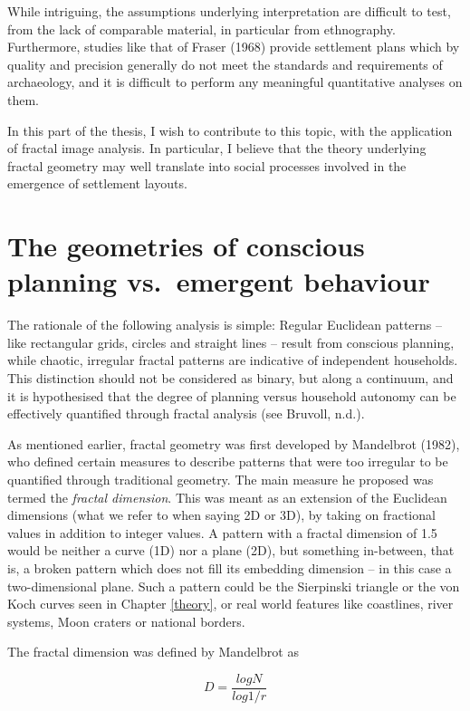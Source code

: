 \documentclass[
  12pt,
  a4paper, twoside]{book}
\begin{document}
While intriguing, the assumptions underlying interpretation are difficult to test, from the lack of comparable material, in particular from ethnography. Furthermore, studies like that of Fraser (1968) provide settlement plans which by quality and precision generally do not meet the standards and requirements of archaeology, and it is difficult to perform any meaningful quantitative analyses on them.

In this part of the thesis, I wish to contribute to this topic, with the application of fractal image analysis. In particular, I believe that the theory underlying fractal geometry may well translate into social processes involved in the emergence of settlement layouts.

\hypertarget{layouts}{%
\section{The geometries of conscious planning vs.~emergent behaviour}\label{layouts}}

The rationale of the following analysis is simple: Regular Euclidean patterns -- like rectangular grids, circles and straight lines -- result from conscious planning, while chaotic, irregular fractal patterns are indicative of independent households. This distinction should not be considered as binary, but along a continuum, and it is hypothesised that the degree of planning versus household autonomy can be effectively quantified through fractal analysis (see Bruvoll, n.d.).

As mentioned earlier, fractal geometry was first developed by Mandelbrot (1982), who defined certain measures to describe patterns that were too irregular to be quantified through traditional geometry. The main measure he proposed was termed the \emph{fractal dimension}. This was meant as an extension of the Euclidean dimensions (what we refer to when saying 2D or 3D), by taking on fractional values in addition to integer values. A pattern with a fractal dimension of 1.5 would be neither a curve (1D) nor a plane (2D), but something in-between, that is, a broken pattern which does not fill its embedding dimension -- in this case a two-dimensional plane. Such a pattern could be the Sierpinski triangle or the von Koch curves seen in Chapter \ref{theory}, or real world features like coastlines, river systems, Moon craters or national borders.

The fractal dimension was defined by Mandelbrot as

\[
D = \frac{log N}{log 1/r}
\]
\end{document}
